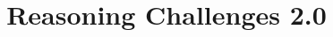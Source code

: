 \documentclass[letterpaper]{article}
\begin{document}
\title{Reasoning Challenges 2.0}
\author{}

\maketitle









\end{document}
